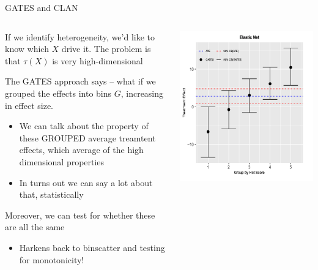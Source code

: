 \documentclass[notes,11pt, aspectratio=169]{beamer}
\newenvironment{wideitemize}{\itemize\addtolength{\itemsep}{10pt}}{\enditemize}
\begin{document}
\begin{frame}{GATES and CLAN}
    \begin{columns}[onlytextwidth, T] %
      \begin{column}{.5\textwidth}
  \begin{wideitemize}
  \item If we identify heterogeneity, we'd like to know which $X$
    drive it.  The problem is that $\tau(X)$ is very high-dimensional
  \item The GATES approach says -- what if we grouped the effects into
    bins $G$, increasing in effect size.
    \begin{itemize}
    \item We can talk about the property of these GROUPED average treamtent effects, which average of the high dimensional properties
    \item In turns out we can say a lot about that, statistically
    \end{itemize}
  \item Moreover, we can test for whether these are all the same
    \begin{itemize}
    \item Harkens back to binscatter and testing for monotonicity!
    \end{itemize}
  \end{wideitemize}
      \end{column}%
      \hfill%
      \begin{column}{.5\textwidth}
        \includegraphics[width=\linewidth]{images/GATES.png}
      \end{column}%
    \end{columns}
\end{frame}
\end{document}
